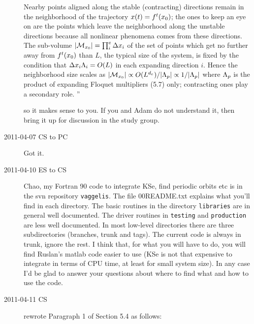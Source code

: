 \begin{description}
\toCB
Nearby points aligned along the stable
(contracting) directions  remain in the neighborhood of the
trajectory $x(t)= {f^{t}({x_0})}$; the ones to keep an eye
on are the points which leave the neighborhood along the
unstable directions because all nonlinear phenomena comes
from these directions. The sub-volume $ |{\cal M}_{{x_0}}| = \prod_i^e\Delta
x_i$ of the set of points which get no further away from
${f^{t}({x_0})}$ than $L$, the typical size of the system, is
fixed by the condition that $\Delta x_i \Lambda_i = O(L)$
in each expanding direction $i$. Hence the neighborhood size
scales as
$|{\cal M}_{{x_0}}| \propto O(L^{d_e})/|\Lambda_p| \propto 1/|\Lambda_p| $
where $\Lambda_p$ is the
product of expanding Floquet multipliers
(5.7) %
only;
contracting ones play a secondary role.
''

so it makes sense to you. If you and Adam do not understand it, then
bring it up for discussion in the study group.

\item[2011-04-07 CS to PC] Got it.


\item[2011-04-10 ES to CS] Chao, my Fortran 90 code to integrate KSe, find
periodic orbits etc is in the svn repository \texttt{vaggelis}. The file 00README.txt
explains what you'll find in each directory. The basic routines in the
directory \texttt{libraries} are in general well documented. The driver routines in
\texttt{testing} and \texttt{production} are less well documented. In most
low-level directories there are three subdirectories (branches, trunk and tags).
The current code is always in trunk, ignore the rest. I think that, for what you
will have to do, you will find Ruslan's matlab code easier to use (KSe is not that
expensive to integrate in terms of CPU time, at least for small system size). In any
case I'd be glad to answer your questions about where to find what and how to
use the code.

\item[2011-04-11 CS]
rewrote Paragraph 1 of Section 5.4 as follows:




\end{description}
